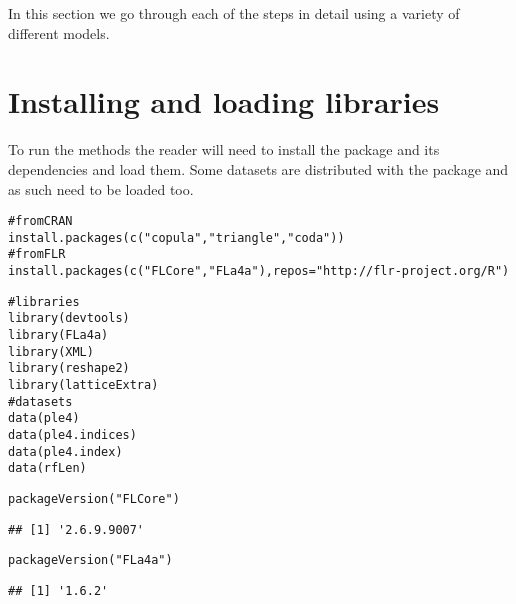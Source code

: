 \documentclass[a4paper,english,10pt]{article}\usepackage[]{graphicx}\usepackage[]{color}
\makeatletter
\newcommand{\hlstr}[1]{\textcolor[rgb]{0.063,0.58,0.627}{#1}}%
\newcommand{\hlcom}[1]{\textcolor[rgb]{0.588,0.588,0.588}{#1}}%
\newcommand{\hlstd}[1]{\textcolor[rgb]{0.196,0.196,0.196}{#1}}%
\newcommand{\hlkwc}[1]{\textcolor[rgb]{0,0.631,0.314}{#1}}%
\newcommand{\hlkwd}[1]{\textcolor[rgb]{0.78,0.227,0.412}{#1}}%
\newenvironment{kframe}{%
 \def\at@end@of@kframe{}%
 \ifinner\ifhmode%
  \def\at@end@of@kframe{\end{minipage}}%
  \begin{minipage}{\columnwidth}%
 \fi\fi%
 \def\FrameCommand##1{\hskip\@totalleftmargin \hskip-\fboxsep
 \colorbox{shadecolor}{##1}\hskip-\fboxsep
     \hskip-\linewidth \hskip-\@totalleftmargin \hskip\columnwidth}%
 \MakeFramed {\advance\hsize-\width
   \@totalleftmargin\z@ \linewidth\hsize
   \@setminipage}}%
 {\par\unskip\endMakeFramed%
 \at@end@of@kframe}
\newenvironment{knitrout}{}{} %
\makeatother
\begin{document}
In this section we go through each of the steps in detail using a variety of different models.




\section{Installing and loading libraries}

To run the  methods the reader will need to install the package and its dependencies and load them. Some datasets are distributed with the package and as such need to be loaded too.

\begin{knitrout}
\color{fgcolor}\begin{kframe}
\begin{alltt}
\hlcom{# from CRAN}
\hlkwd{install.packages}\hlstd{(}\hlkwd{c}\hlstd{(}\hlstr{"copula"}\hlstd{,} \hlstr{"triangle"}\hlstd{,} \hlstr{"coda"}\hlstd{))}
\hlcom{# from FLR}
\hlkwd{install.packages}\hlstd{(}\hlkwd{c}\hlstd{(}\hlstr{"FLCore"}\hlstd{,} \hlstr{"FLa4a"}\hlstd{),} \hlkwc{repos} \hlstd{=} \hlstr{"http://flr-project.org/R"}\hlstd{)}
\end{alltt}
\end{kframe}
\end{knitrout}

\begin{knitrout}
\color{fgcolor}\begin{kframe}
\begin{alltt}
\hlcom{# libraries}
\hlkwd{library}\hlstd{(devtools)}
\hlkwd{library}\hlstd{(FLa4a)}
\hlkwd{library}\hlstd{(XML)}
\hlkwd{library}\hlstd{(reshape2)}
\hlkwd{library}\hlstd{(latticeExtra)}
\hlcom{# datasets}
\hlkwd{data}\hlstd{(ple4)}
\hlkwd{data}\hlstd{(ple4.indices)}
\hlkwd{data}\hlstd{(ple4.index)}
\hlkwd{data}\hlstd{(rfLen)}
\end{alltt}
\end{kframe}
\end{knitrout}

\begin{knitrout}
\color{fgcolor}\begin{kframe}
\begin{alltt}
\hlkwd{packageVersion}\hlstd{(}\hlstr{"FLCore"}\hlstd{)}
\end{alltt}
\begin{verbatim}
## [1] '2.6.9.9007'
\end{verbatim}
\begin{alltt}
\hlkwd{packageVersion}\hlstd{(}\hlstr{"FLa4a"}\hlstd{)}
\end{alltt}
\begin{verbatim}
## [1] '1.6.2'
\end{verbatim}
\end{kframe}
\end{knitrout}
\end{document}
